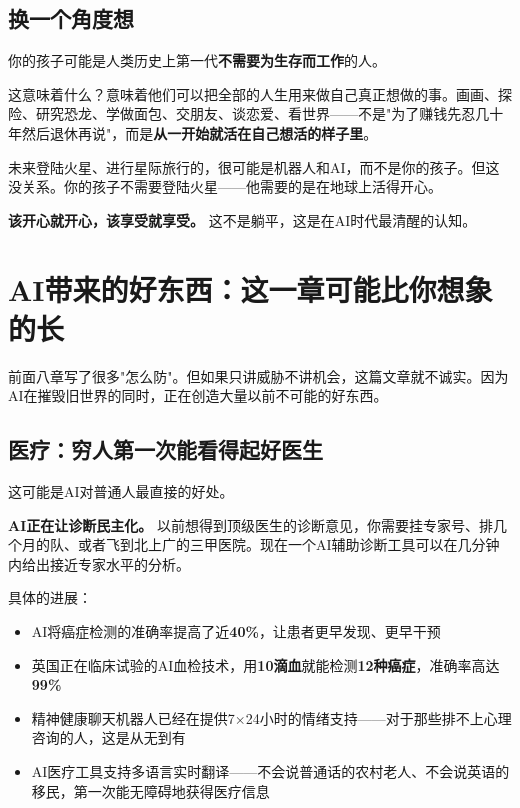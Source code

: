 \documentclass[a4paper,12pt,UTF8]{ctexart}
\begin{document}
\subsection{换一个角度想}

你的孩子可能是人类历史上第一代\textbf{不需要为生存而工作}的人。

这意味着什么？意味着他们可以把全部的人生用来做自己真正想做的事。画画、探险、研究恐龙、学做面包、交朋友、谈恋爱、看世界——不是"为了赚钱先忍几十年然后退休再说"，而是\textbf{从一开始就活在自己想活的样子里}。

未来登陆火星、进行星际旅行的，很可能是机器人和AI，而不是你的孩子。但这没关系。你的孩子不需要登陆火星——他需要的是在地球上活得开心。

\textbf{该开心就开心，该享受就享受。} 这不是躺平，这是在AI时代最清醒的认知。

\section{AI带来的好东西：这一章可能比你想象的长}

前面八章写了很多"怎么防"。但如果只讲威胁不讲机会，这篇文章就不诚实。因为AI在摧毁旧世界的同时，正在创造大量以前不可能的好东西。

\subsection{医疗：穷人第一次能看得起好医生}

这可能是AI对普通人最直接的好处。

\textbf{AI正在让诊断民主化。} 以前想得到顶级医生的诊断意见，你需要挂专家号、排几个月的队、或者飞到北上广的三甲医院。现在一个AI辅助诊断工具可以在几分钟内给出接近专家水平的分析。

具体的进展：
\begin{itemize}
\item AI将癌症检测的准确率提高了近\textbf{40\%}，让患者更早发现、更早干预
\item 英国正在临床试验的AI血检技术，用\textbf{10滴血}就能检测\textbf{12种癌症}，准确率高达\textbf{99\%}
\item 精神健康聊天机器人已经在提供7$\times$24小时的情绪支持——对于那些排不上心理咨询的人，这是从无到有
\item AI医疗工具支持多语言实时翻译——不会说普通话的农村老人、不会说英语的移民，第一次能无障碍地获得医疗信息
\end{itemize}
\end{document}
